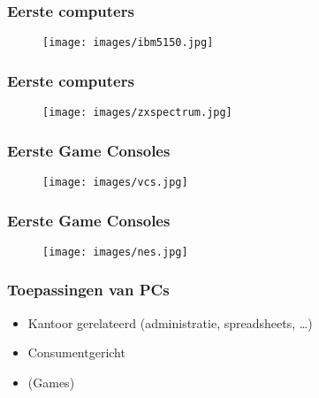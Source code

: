 \documentclass[aspectratio=43]{uva-inf-presentation}
\begin{document}

\begin{frame}
\frametitle{Eerste computers}

\begin{figure}
\texttt{[image: images/ibm5150.jpg]}
\end{figure}

\end{frame}


\begin{frame}
\frametitle{Eerste computers}

\begin{figure}
\texttt{[image: images/zxspectrum.jpg]}
\end{figure}

\end{frame}


\begin{frame}
\frametitle{Eerste Game Consoles}

\begin{figure}
\texttt{[image: images/vcs.jpg]}
\end{figure}

\end{frame}


\begin{frame}
\frametitle{Eerste Game Consoles}

\begin{figure}
\texttt{[image: images/nes.jpg]}
\end{figure}

\end{frame}


\begin{frame}
\frametitle{Toepassingen van PCs}

\begin{itemize}
\item Kantoor gerelateerd (administratie, spreadsheets, \dots)
\item Consumentgericht
\item (Games)
\end{itemize}

\end{frame}
\end{document}
